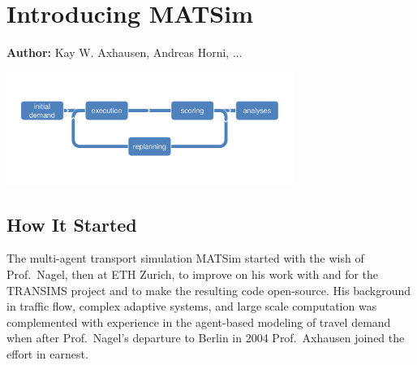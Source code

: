 \chapter{Introducing MATSim}
\label{ch:introducing}
\hfill \textbf{Author:} Kay W. Axhausen, Andreas Horni, ...

\begin{center} \includegraphics[width=0.7\textwidth, angle=0]{figures/matsimcycle.pdf} \end{center}



\section{How It Started}
The multi-\gls{agent} transport simulation MATSim \citep[][]{MATSIM-T_Webpage_2014} started with the wish of Prof.\ Nagel, then at ETH Zurich, to improve on his work with and for the TRANSIMS project \citep[][]{SmithEtAl_NTRPAC_1995} and to make the resulting code open-source. His background in traffic flow, complex adaptive systems, and large scale computation was complemented with experience in the agent-based modeling of travel demand when after Prof.\ Nagel's departure to Berlin in 2004 Prof.\ Axhausen joined the effort in earnest. 

